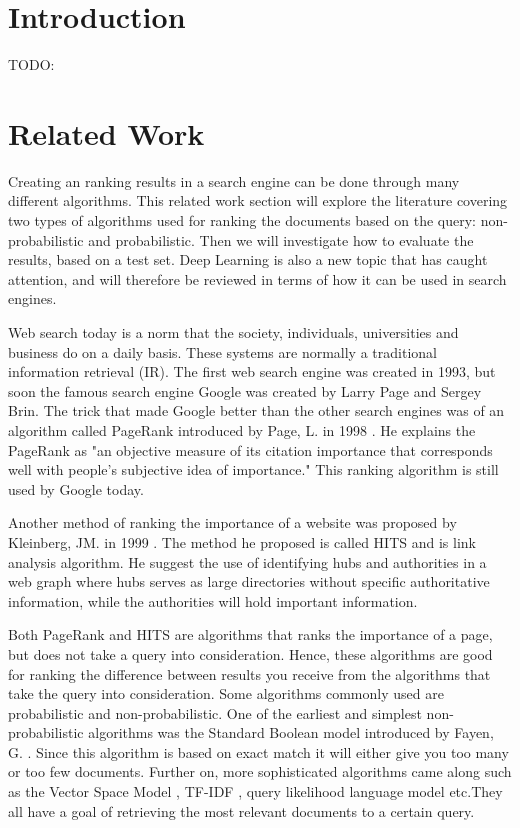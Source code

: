 \section{Introduction}

TODO:

\section{Related Work}
Creating an ranking results in a search engine can be done through many different algorithms. This related work section will explore the literature covering two types of algorithms used for ranking the documents based on the query: non-probabilistic and probabilistic. Then we will investigate how to evaluate the results, based on a test set. Deep Learning is also a new topic that has caught attention, and will therefore be reviewed in terms of how it can be used in search engines.

Web search today is a norm that the society, individuals, universities and business do on a daily basis. These systems are normally a traditional information retrieval (IR). The first web search engine was created in 1993, but soon the famous search engine Google was created by Larry Page and Sergey Brin. The trick that made Google better than the other search engines was of an algorithm called PageRank introduced by Page, L. in 1998 \cite{brin1998anatomy}. He explains the PageRank as "an objective measure of its citation importance that corresponds well with people’s subjective idea of importance." This ranking algorithm is still used by Google today.

Another method of ranking the importance of a website was proposed by Kleinberg, JM. in 1999 \cite{kleinberg1999authoritative}. The method he proposed is called HITS and is link analysis algorithm. He suggest the use of identifying hubs and authorities in a web graph where hubs serves as large directories without specific authoritative information, while the authorities will hold important information.

Both PageRank and HITS are algorithms that ranks the importance of a page, but does not take a query into consideration. Hence, these algorithms are good for ranking the difference between results you receive from the algorithms that take the query into consideration. Some algorithms commonly used are probabilistic and non-probabilistic. One of the earliest and simplest non-probabilistic algorithms was the Standard Boolean model introduced by Fayen, G. \cite{lancaster1973fayen}. Since this algorithm is based on exact match it will either give you too many or too few documents. Further on, more sophisticated algorithms came along such as the Vector Space Model \cite{salton1975vector}, TF-IDF \cite{salton1983mcgill}, query likelihood language model \cite{zhai2001model} etc.They all have a goal of retrieving the most relevant documents to a certain query.

